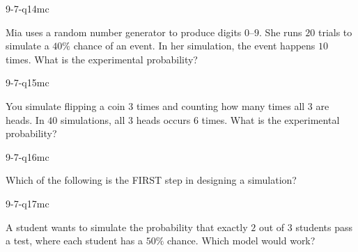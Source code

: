 \begin{practiceQuestion}{9-7-q14}{mc}
\begin{questionText}
Mia uses a random number generator to produce digits $0$--$9$. She runs $20$ trials to simulate a $40\%$ chance of an event. In her simulation, the event happens $10$ times. What is the experimental probability?
\end{questionText}
\end{practiceQuestion}

\begin{practiceQuestion}{9-7-q15}{mc}
\begin{questionText}
You simulate flipping a coin $3$ times and counting how many times all $3$ are heads. In $40$ simulations, all $3$ heads occurs $6$ times. What is the experimental probability?
\end{questionText}
\end{practiceQuestion}

\begin{practiceQuestion}{9-7-q16}{mc}
\begin{questionText}
Which of the following is the FIRST step in designing a simulation?
\end{questionText}
\end{practiceQuestion}

\begin{practiceQuestion}{9-7-q17}{mc}
\begin{questionText}
A student wants to simulate the probability that exactly $2$ out of $3$ students pass a test, where each student has a $50\%$ chance. Which model would work?
\end{questionText}
\end{practiceQuestion}

